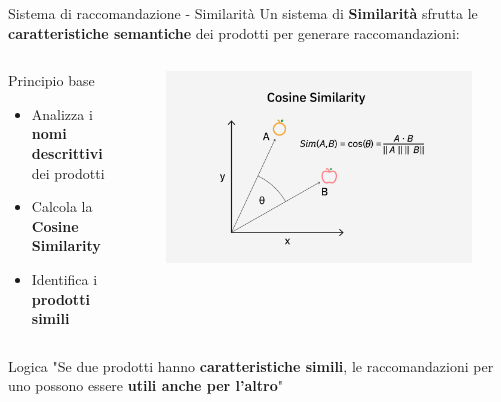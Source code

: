 \documentclass{beamer}
\begin{document}
	\begin{frame}{Sistema di raccomandazione - Similarità}
		Un sistema di \textbf{Similarità} sfrutta le \textbf{caratteristiche semantiche} dei prodotti per generare raccomandazioni:

		\begin{columns}
			\begin{column}{0.6\textwidth}
				\begin{block}{Principio base}
					\begin{itemize}
						\item Analizza i \textbf{nomi descrittivi} dei prodotti
						\item Calcola la \textbf{Cosine Similarity}
						\item Identifica i \textbf{prodotti simili}
					\end{itemize}
				\end{block}
			\end{column}
			\begin{column}{0.5\textwidth}
				\begin{figure}
					\centering
					\includegraphics[width=\textwidth]{Cosine-Similarity.png}
				\end{figure}
			\end{column}
		\end{columns}

		\begin{alertblock}{Logica}
			"Se due prodotti hanno \textbf{caratteristiche simili}, le raccomandazioni per uno possono essere \textbf{utili anche per l'altro}"
		\end{alertblock}
	\end{frame}
\end{document}
